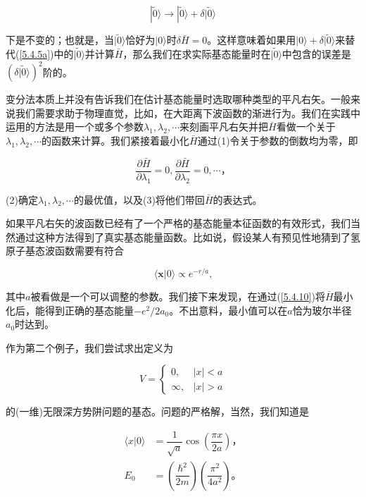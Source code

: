 ﻿\documentclass[UTF8,twoside]{ctexart}
\begin{document}
\begin{equation} \label{5.4.8}
|\tilde{0}\rangle\rightarrow|\tilde{0}\rangle+\delta|\tilde{0}\rangle
\end{equation}

\noindent 下是不变的；也就是，当$|\tilde{0}\rangle$恰好为$|0\rangle$时$\delta\bar{H}=0$。这样意味着如果用$|0\rangle+\delta|\tilde{0}\rangle$来替代(\ref{5.4.5a})中的$|\tilde{0}\rangle$并计算$\bar{H}$，那么我们在求实际基态能量时在$|\tilde{0}\rangle$中包含的误差是$(\delta|\tilde{0}\rangle)^2$阶的。

变分法本质上并没有告诉我们在估计基态能量时选取哪种类型的平凡右矢。一般来说我们需要求助于物理直觉，比如，在大距离下波函数的渐进行为。我们在实践中运用的方法是用一个或多个参数$\lambda_1,\lambda_2,\cdots$来刻画平凡右矢并把$\bar{H}$看做一个关于$\lambda_1,\lambda_2,\cdots$的函数来计算。我们紧接着最小化$\bar{H}$通过(1)令关于参数的倒数均为零，即

\begin{equation} \label{5.4.9}
\dfrac{\partial\bar{H}}{\partial\lambda_1}=0,\dfrac{\partial\bar{H}}{\partial\lambda_2}=0,\cdots\text{，}
\end{equation}

\noindent (2)确定$\lambda_1,\lambda_2,\cdots$的最优值，以及(3)将他们带回$\bar{H}$的表达式。

如果平凡右矢的波函数已经有了一个严格的基态能量本征函数的有效形式，我们当然通过这种方法得到了真实基态能量函数。比如说，假设某人有预见性地猜到了氢原子基态波函数需要有符合

\begin{equation} \label{5.4.10}
\langle\boldsymbol{x}|0\rangle\propto e^{-r/a}\text{,}
\end{equation}

\noindent 其中$a$被看做是一个可以调整的参数。我们接下来发现，在通过(\ref{5.4.10})将$\bar{H}$最小化后，能得到正确的基态能量$-e^2/2a_0$。不出意料，最小值可以在$a$恰为玻尔半径$a_0$时达到。

作为第二个例子，我们尝试求出定义为

\begin{equation} \label{5.4.11}
V=\begin{cases}
0, &|x|<a\\
\infty, &|x|>a
\end{cases}
\end{equation}

\noindent 的(一维)无限深方势阱问题的基态。问题的严格解，当然，我们知道是

\begin{equation} \label{5.4.12}
\begin{split}
\langle x|0\rangle&=\dfrac{1}{\sqrt{a}}\cos\left(\dfrac{\pi x}{2a}\right)\text{，}\\
E_0&=\left(\dfrac{\hbar^2}{2m}\right)\left(\dfrac{\pi^2}{4a^2}\right)\text{。}
\end{split}
\end{equation}
\end{document}
